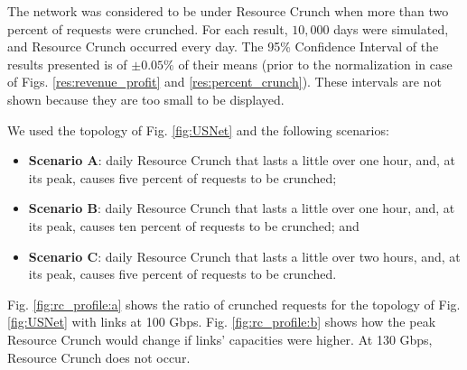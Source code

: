 \documentclass[journal]{IEEEtran}
\begin{document}
The network was considered to be under Resource Crunch when more than two percent of requests were crunched. For each result, $10,000$ days were simulated, and Resource Crunch occurred every day. The 95\% Confidence Interval of the results presented is of $\pm 0.05 \%$ of their means (prior to the normalization in case of Figs. \ref{res:revenue_profit} and \ref{res:percent_crunch}). These intervals are not shown because they are too small to be displayed.

We used the topology of Fig. \ref{fig:USNet} and the following scenarios:
\begin{itemize}%
 \item \textbf{Scenario A}: daily Resource Crunch that lasts a little over one hour, and, at its peak, causes five percent of requests to be crunched;
 \item \textbf{Scenario B}: daily Resource Crunch that lasts a little over one hour, and, at its peak, causes ten percent of requests to be crunched; and
 \item \textbf{Scenario C}: daily Resource Crunch that lasts a little over two hours, and, at its peak, causes five percent of requests to be crunched.
\end{itemize}

Fig. \ref{fig:rc_profile:a} shows the ratio of crunched requests for the topology of Fig. \ref{fig:USNet} with links at 100 Gbps. Fig. \ref{fig:rc_profile:b} shows how the peak Resource Crunch would change if links' capacities were higher. At 130 Gbps, Resource Crunch does not occur. %
\end{document}

